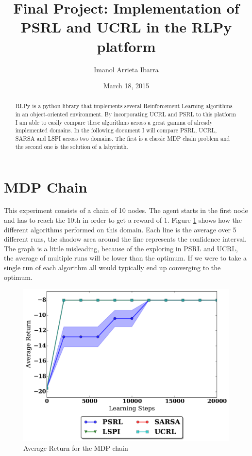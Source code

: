 \documentclass[12pt]{article}
\begin{document}
\title{Final Project: Implementation of PSRL and UCRL in the RLPy platform}
\date{March 18, 2015}
\author{Imanol Arrieta Ibarra}
\maketitle

\begin{abstract}
RLPy is a python library that implements several Reinforcement Learning algorithms in an object-oriented environment. By incorporating UCRL and PSRL to this platform I am able to easily compare these algorithms across a great gamma of already implemented domains. In the following document I will compare PSRL, UCRL, SARSA and LSPI across two domains. The first is a classic MDP chain problem and the second one is the solution of a labyrinth. 
\end{abstract}

\section{MDP Chain}

This experiment consists of a chain of 10 nodes. The agent starts in the first node and has to reach the 10th in order to get a reward of 1.  Figure \ref{fig:res_mdp} shows how the different algorithms performed on this domain. Each line is the average over 5 different runs, the shadow area around the line represents the confidence interval. The graph is a little misleading,  because of the exploring in PSRL and UCRL, the average of multiple runs will be lower than the optimum. If we were to take a single run of each algorithm all would typically 
end up converging to the optimum. 

\begin{figure}[h]
\centering
\includegraphics[scale=.4]{MDP.pdf}
\caption{Average Return for the MDP chain}
\label{fig:res_mdp}
\end{figure}
\end{document}
